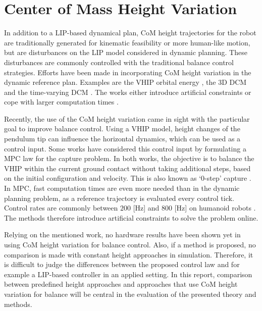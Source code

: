 \section{Center of Mass Height Variation}
In addition to a \ac{LIP}-based dynamical plan, \ac{CoM} height trajectories for the robot are traditionally generated for kinematic feasibility or more human-like motion, but are disturbances on the \ac{LIP} model considered in dynamic planning. These disturbances are commonly controlled with the traditional balance control strategies. Efforts have been made in incorporating \ac{CoM} height variation in the dynamic reference plan. Examples are the \ac{VHIP} orbital energy \cite{pratt2007derivation}, the \ac{3D} \ac{DCM} \cite{englsberger2013three} and the time-varying \ac{DCM} \cite{hopkins2014humanoid}. The works either introduce artificial constraints \cite{pratt2007derivation} or cope with larger computation times \cite{hopkins2014humanoid}.

Recently, the use of the \ac{CoM} height variation came in sight with the particular goal to improve balance control. Using a \ac{VHIP} model, height changes of the pendulum tip can influence the horizontal dynamics, which can be used as a control input. Some works have considered this control input by formulating a \ac{MPC} law \cite{koolen2016balance, caron2018balance} for the capture problem. In both works, the objective is to balance the \ac{VHIP} within the current ground contact without taking additional steps, based on the initial configuration and velocity. This is also known as `0-step' capture \cite{koolen2012capturability}. In \ac{MPC}, fast computation times are even more needed than in the dynamic planning problem, as a reference trajectory is evaluated every control tick. Control rates are commonly between $200$ [Hz] and $800$ [Hz] on humanoid robots \cite{koolen2016design, kuindersma2016optimization}. The methods therefore introduce artificial constraints to solve the problem online.

Relying on the mentioned work, no hardware results have been shown yet in using \ac{CoM} height variation for balance control. Also, if a method is proposed, no comparison is made with constant height approaches in simulation. Therefore, it is difficult to judge the differences between the proposed control law and for example a \ac{LIP}-based controller in an applied setting. In this report, comparison between predefined height approaches and approaches that use \ac{CoM} height variation for balance will be central in the evaluation of the presented theory and methods.

